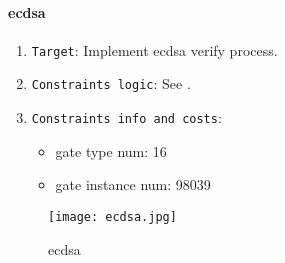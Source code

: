 \paragraph{ecdsa}

\begin{enumerate}
    \item \verb|Target|: Implement ecdsa verify process.
    \item \verb|Constraints logic|: See .
    \item \verb|Constraints info and costs|:
    \begin{itemize}
        \item gate type num: 16
        \item gate instance num: 98039
    \end{itemize}
\end{enumerate}

\begin{figure}[!ht]
    \centering
    \texttt{[image: ecdsa.jpg]}
    \caption{ecdsa}
    \label{fig:ecdsa}
\end{figure}